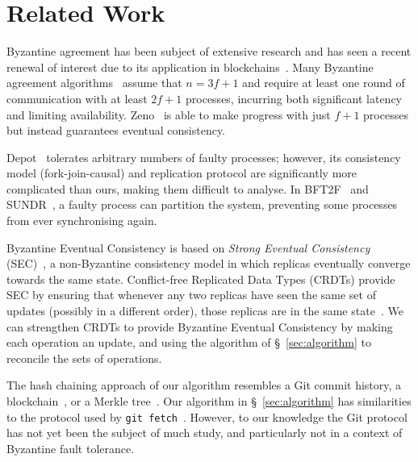 \documentclass[manuscript,anonymous]{acmart}
\begin{document}

\section{Related Work}

Byzantine agreement has been subject of extensive research and has seen a recent renewal of interest due to its application in blockchains~\cite{Bano:2019}.
Many Byzantine agreement algorithms~\cite{Castro:1999,Kotla:2007,Aublin:2015} assume that $n=3f+1$ and require at least one round of communication with at least $2f+1$ processes, incurring both significant latency and limiting availability.
Zeno~\cite{Singh:2009} is able to make progress with just $f+1$ processes but instead guarantees eventual consistency.

Depot~\cite{Mahajan:2011} tolerates arbitrary numbers of faulty processes; however, its consistency model (fork-join-causal) and replication protocol are significantly more complicated than ours, making them difficult to analyse.
In BFT2F~\cite{Li:2007} and SUNDR~\cite{Mazieres:2002}, a faulty process can partition the system, preventing some processes from ever synchronising again.

Byzantine Eventual Consistency is based on \emph{Strong Eventual Consistency} (SEC)~\cite{Shapiro:2011}, a non-Byzantine consistency model in which replicas eventually converge towards the same state.
Conflict-free Replicated Data Types (CRDTs) provide SEC by ensuring that whenever any two replicas have seen the same set of updates (possibly in a different order), those replicas are in the same state~\cite{Shapiro:2011}.
We can strengthen CRDTs to provide Byzantine Eventual Consistency by making each operation an update, and using the algorithm of \S~\ref{sec:algorithm} to reconcile the sets of operations.

The hash chaining approach of our algorithm resembles a Git commit history, a blockchain~\cite{Bano:2019}, or a Merkle tree~\cite{Merkle:1987}.
Our algorithm in \S~\ref{sec:algorithm} has similarities to the protocol used by \texttt{git fetch}~\cite{GitHTTP}.
However, to our knowledge the Git protocol has not yet been the subject of much study, and particularly not in a context of Byzantine fault tolerance.


\end{document}
